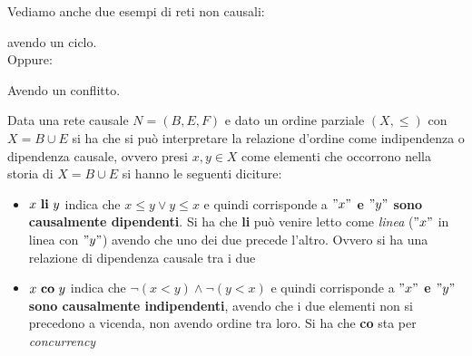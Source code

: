 \begin{esempio}
  Vediamo anche due esempi di reti non causali:
  \begin{figure}[H]
    \centering
  \end{figure}
  avendo un ciclo.\\
  Oppure:
  \begin{figure}[H]
    \centering
  \end{figure}
  Avendo un conflitto.
\end{esempio}
\begin{definizione}
  Data una rete causale $N=(B, E, F)$ e dato un ordine parziale $(X, \leq)$ con
  $X=B\cup E$ si ha che si può interpretare la relazione d'ordine come
  indipendenza o dipendenza causale, ovvero presi $x, y\in X$ come elementi che
  occorrono nella storia di $X=B\cup E$ si hanno le seguenti diciture:
  \begin{itemize}
    \item $x \mbox{ \textbf{li} }y$ indica che $x\leq y\lor y\leq x$ e quindi
    corrisponde a \textbf{$"x"$ e $"y"$ sono causalmente dipendenti}. Si ha che
    \textbf{li} può venire letto come \textit{linea} ($"x"$ in linea con $"y"$)
    avendo che uno dei due precede l'altro.  Ovvero si ha una relazione di dipendenza causale tra i due
    \item $x \mbox{ \textbf{co} }y$ indica che $\neg(x< y)\land \neg(y < x)$ e
    quindi corrisponde a \textbf{$"x"$ e $"y"$ sono causalmente indipendenti},
    avendo che i due elementi non si precedono a vicenda, non avendo ordine tra
    loro. Si ha che \textbf{co} sta per \textit{concurrency}
  \end{itemize}
\end{definizione} \vspace{5mm} %
